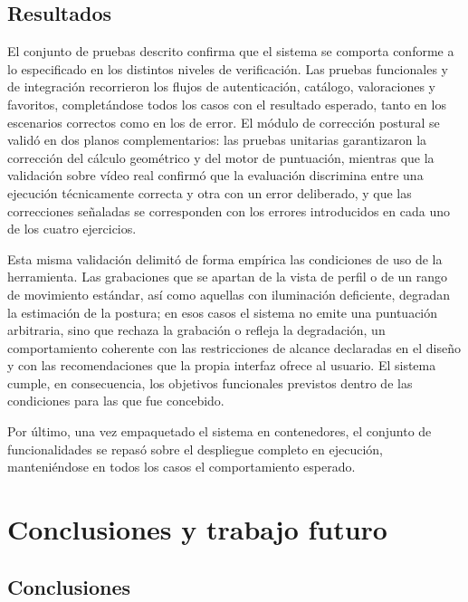 \documentclass[12pt,a4paper,twoside,openright]{book}
\begin{document}
    \section{Resultados}

    El conjunto de pruebas descrito confirma que el sistema se comporta conforme
    a lo especificado en los distintos niveles de verificación. Las pruebas
    funcionales y de integración recorrieron los flujos de autenticación,
    catálogo, valoraciones y favoritos, completándose todos los casos con el
    resultado esperado, tanto en los escenarios correctos como en los de error.
    El módulo de corrección postural se validó en dos planos complementarios: las
    pruebas unitarias garantizaron la corrección del cálculo geométrico y del
    motor de puntuación, mientras que la validación sobre vídeo real confirmó que
    la evaluación discrimina entre una ejecución técnicamente correcta y otra con
    un error deliberado, y que las correcciones señaladas se corresponden con los
    errores introducidos en cada uno de los cuatro ejercicios.

    Esta misma validación delimitó de forma empírica las condiciones de uso de la
    herramienta. Las grabaciones que se apartan de la vista de perfil o de un
    rango de movimiento estándar, así como aquellas con iluminación deficiente,
    degradan la estimación de la postura; en esos casos el sistema no emite una
    puntuación arbitraria, sino que rechaza la grabación o refleja la
    degradación, un comportamiento coherente con las restricciones de alcance
    declaradas en el diseño y con las recomendaciones que la propia interfaz
    ofrece al usuario. El sistema cumple, en consecuencia, los objetivos
    funcionales previstos dentro de las condiciones para las que fue concebido.

    Por último, una vez empaquetado el sistema en contenedores, el conjunto de
    funcionalidades se repasó sobre el despliegue completo en ejecución,
    manteniéndose en todos los casos el comportamiento esperado.




    \chapter{Conclusiones y trabajo futuro}
    \label{cap:conclusiones}


\section{Conclusiones}
\end{document}
